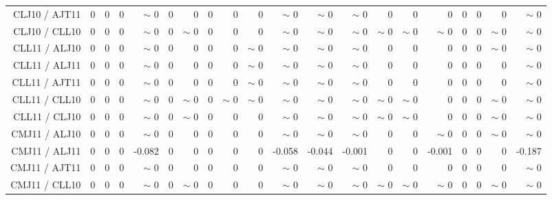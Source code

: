 \begin{table}[H]
\begin{center}
\begin{tabular}{|r|rrrrrrrrrrrrrrrrrr|r|}
CLJ10 / AJT11 &  0 &  0 &  0 &  {\tiny $\sim$ }0 &  0 &  0 &  0 &  0 &  0 &  {\tiny $\sim$ }0 &  {\tiny $\sim$ }0 &  {\tiny $\sim$ }0 &  0 &  0 &  0 &  0 &  0 &  0 &  {\tiny $\sim$ }0 \\
CLJ10 / CLL10 &  0 &  0 &  0 &  {\tiny $\sim$ }0 &  0 &  {\tiny $\sim$ }0 &  0 &  0 &  0 &  {\tiny $\sim$ }0 &  {\tiny $\sim$ }0 &  {\tiny $\sim$ }0 &  {\tiny $\sim$ }0 &  {\tiny $\sim$ }0 &  {\tiny $\sim$ }0 &  0 &  0 &  {\tiny $\sim$ }0 &  {\tiny $\sim$ }0 \\
CLL11 / ALJ10 &  0 &  0 &  0 &  {\tiny $\sim$ }0 &  0 &  0 &  0 &  0 &  {\tiny $\sim$ }0 &  {\tiny $\sim$ }0 &  {\tiny $\sim$ }0 &  {\tiny $\sim$ }0 &  0 &  0 &  0 &  0 &  0 &  {\tiny $\sim$ }0 &  {\tiny $\sim$ }0 \\
CLL11 / ALJ11 &  0 &  0 &  0 &  {\tiny $\sim$ }0 &  0 &  0 &  0 &  0 &  {\tiny $\sim$ }0 &  {\tiny $\sim$ }0 &  {\tiny $\sim$ }0 &  {\tiny $\sim$ }0 &  0 &  0 &  0 &  0 &  0 &  0 &  {\tiny $\sim$ }0 \\
CLL11 / AJT11 &  0 &  0 &  0 &  {\tiny $\sim$ }0 &  0 &  0 &  0 &  0 &  {\tiny $\sim$ }0 &  {\tiny $\sim$ }0 &  {\tiny $\sim$ }0 &  {\tiny $\sim$ }0 &  0 &  0 &  0 &  0 &  0 &  0 &  {\tiny $\sim$ }0 \\
CLL11 / CLL10 &  0 &  0 &  0 &  {\tiny $\sim$ }0 &  0 &  {\tiny $\sim$ }0 &  0 &  {\tiny $\sim$ }0 &  {\tiny $\sim$ }0 &  {\tiny $\sim$ }0 &  {\tiny $\sim$ }0 &  {\tiny $\sim$ }0 &  {\tiny $\sim$ }0 &  {\tiny $\sim$ }0 &  0 &  0 &  0 &  {\tiny $\sim$ }0 &  {\tiny $\sim$ }0 \\
CLL11 / CLJ10 &  0 &  0 &  0 &  {\tiny $\sim$ }0 &  0 &  {\tiny $\sim$ }0 &  0 &  0 &  0 &  {\tiny $\sim$ }0 &  {\tiny $\sim$ }0 &  {\tiny $\sim$ }0 &  {\tiny $\sim$ }0 &  {\tiny $\sim$ }0 &  0 &  0 &  0 &  {\tiny $\sim$ }0 &  {\tiny $\sim$ }0 \\
CMJ11 / ALJ10 &  0 &  0 &  0 &  {\tiny $\sim$ }0 &  0 &  0 &  0 &  0 &  0 &  {\tiny $\sim$ }0 &  {\tiny $\sim$ }0 &  {\tiny $\sim$ }0 &  0 &  0 &  {\tiny $\sim$ }0 &  0 &  0 &  {\tiny $\sim$ }0 &  {\tiny $\sim$ }0 \\
CMJ11 / ALJ11 &  0 &  0 &  0 &     -0.082 &  0 &  0 &  0 &  0 &  0 &     -0.058 &     -0.044 &     -0.001 &  0 &  0 &     -0.001 &  0 &  0 &  0 &     -0.187 \\
CMJ11 / AJT11 &  0 &  0 &  0 &  {\tiny $\sim$ }0 &  0 &  0 &  0 &  0 &  0 &  {\tiny $\sim$ }0 &  {\tiny $\sim$ }0 &  {\tiny $\sim$ }0 &  0 &  0 &  0 &  0 &  0 &  0 &  {\tiny $\sim$ }0 \\
CMJ11 / CLL10 &  0 &  0 &  0 &  {\tiny $\sim$ }0 &  0 &  {\tiny $\sim$ }0 &  0 &  0 &  0 &  {\tiny $\sim$ }0 &  {\tiny $\sim$ }0 &  {\tiny $\sim$ }0 &  {\tiny $\sim$ }0 &  {\tiny $\sim$ }0 &  {\tiny $\sim$ }0 &  0 &  0 &  {\tiny $\sim$ }0 &  {\tiny $\sim$ }0 \\

\end{tabular}
\end{center}
\end{table}
